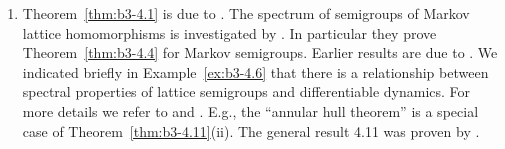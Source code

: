 \begin{enumerate}[label=\emph{Section \arabic*:}, wide]
\item
Theorem~\ref{thm:b3-4.1} is due to \citet{derndinger:1984}.
The spectrum of semigroups of Markov lattice homomorphisms is investigated by \citet{derndingernagel:1979}.
In particular they prove Theorem~\ref{thm:b3-4.4} for Markov semigroups.
Earlier results are due to \citet{scarpellini:1974}.
We indicated briefly in Example~\ref{ex:b3-4.6} that there is a relationship between spectral properties of lattice semigroups and differentiable dynamics.
For more details we refer to \citet{chiconeswanson:1981} and \citet{sackersell:1978}.
E.g., the \enquote{annular hull theorem} is a special case of Theorem~\ref{thm:b3-4.11}(ii).
The general result 4.11 was proven by \citet{arendtgreiner:1984}.

\end{enumerate}


{\RaggedRight

}
 
 